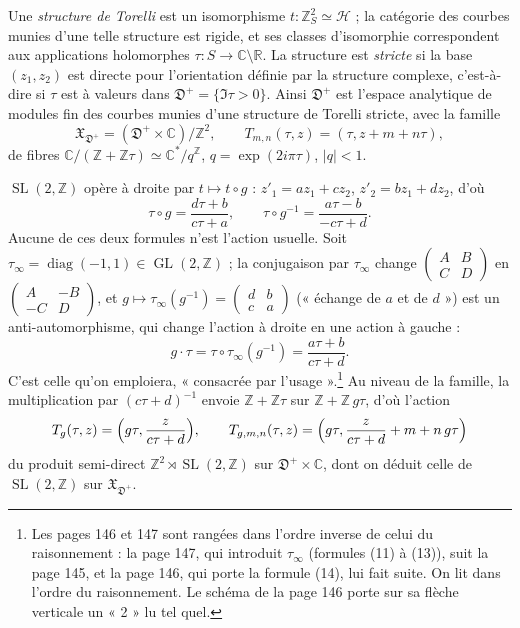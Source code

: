 \documentclass[11pt,a4paper]{article}
\begin{document}
Une \emph{structure de Torelli} est un isomorphisme $t : \mathbb{Z}^2_S \simeq
\mathcal{H}$ ; la catégorie des courbes munies d'une telle structure est rigide,
et ses classes d'isomorphie correspondent aux applications holomorphes $\tau : S
\to \mathbb{C} \setminus \mathbb{R}$. La structure est \emph{stricte} si la base
$(z_1, z_2)$ est directe pour l'orientation définie par la structure complexe,
c'est-à-dire si $\tau$ est à valeurs dans $\mathfrak{D}^{+} = \{\Im \tau > 0\}$.
Ainsi $\mathfrak{D}^{+}$ est l'espace analytique de modules fin des courbes
munies d'une structure de Torelli stricte, avec la famille
\[
\mathfrak{X}_{\mathfrak{D}^{+}} = (\mathfrak{D}^{+} \times \mathbb{C}) /
\mathbb{Z}^2, \qquad T_{m,n}(\tau, z) = (\tau, z + m + n\tau),
\]
de fibres $\mathbb{C}/(\mathbb{Z} + \mathbb{Z}\tau) \simeq \mathbb{C}^{*}/q^{\mathbb{Z}}$,
$q = \exp(2i\pi\tau)$, $|q| < 1$.

$\operatorname{SL}(2, \mathbb{Z})$ opère à droite par $t \mapsto t \circ g$ :
$z'_1 = a z_1 + c z_2$, $z'_2 = b z_1 + d z_2$, d'où
\[
\tau \circ g = \frac{d\tau + b}{c\tau + a}, \qquad \tau \circ g^{-1} = \frac{a\tau -
b}{-c\tau + d} .
\]
Aucune de ces deux formules n'est l'action usuelle. Soit $\tau_\infty =
\operatorname{diag}(-1, 1) \in \operatorname{GL}(2, \mathbb{Z})$ ; la conjugaison
par $\tau_\infty$ change $\begin{pmatrix} A & B \\ C & D \end{pmatrix}$ en
$\begin{pmatrix} A & -B \\ -C & D \end{pmatrix}$, et $g \mapsto
\tau_\infty(g^{-1}) = \begin{pmatrix} d & b \\ c & a \end{pmatrix}$ (« échange
de $a$ et de $d$ ») est un anti-automorphisme, qui change l'action à droite
en une action à gauche :
\[
g \cdot \tau = \tau \circ \tau_\infty(g^{-1}) = \frac{a\tau + b}{c\tau + d} .
\]
C'est celle qu'on emploiera, « consacrée par l'usage ».\footnote{Les pages 146 et
147 sont rangées dans l'ordre inverse de celui du raisonnement : la page 147,
qui introduit $\tau_\infty$ (formules (11) à (13)), suit la page 145, et la page
146, qui porte la formule (14), lui fait suite. On lit dans l'ordre du
raisonnement. Le schéma de la page 146 porte sur sa flèche verticale un « 2 »
lu tel quel.} Au niveau de la famille, la multiplication par $(c\tau + d)^{-1}$
envoie $\mathbb{Z} + \mathbb{Z}\tau$ sur $\mathbb{Z} + \mathbb{Z}\, g\tau$, d'où
l'action
\[
T_g(\tau, z) = \Bigl( g\tau, \frac{z}{c\tau + d} \Bigr), \qquad T_{g,m,n}(\tau,
z) = \Bigl( g\tau, \frac{z}{c\tau + d} + m + n\, g\tau \Bigr)
\]
du produit semi-direct $\mathbb{Z}^2 \rtimes \operatorname{SL}(2, \mathbb{Z})$
sur $\mathfrak{D}^{+} \times \mathbb{C}$, dont on déduit celle de
$\operatorname{SL}(2, \mathbb{Z})$ sur $\mathfrak{X}_{\mathfrak{D}^{+}}$.
\end{document}
